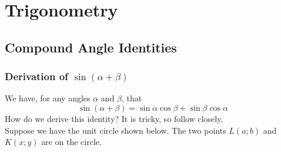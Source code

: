 \chapter{Trigonometry}
\label{m:t12}

\section{Compound Angle Identities}

\subsection{Derivation of $\sin(\alpha + \beta)$}
We have, for any angles $\alpha$ and $\beta$, that
$$\sin(\alpha+\beta)=\sin\alpha\cos\beta+\sin\beta\cos\alpha$$
How do we derive this identity? It is tricky, so follow closely.\\

Suppose we have the unit circle shown below. The two points $L(a;b)$ and $K(x;y)$ are on the circle.


